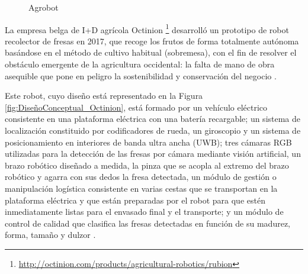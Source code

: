 \begin{figure}[H]
    \begin{center}
      \subcapcentertrue
      \hspace{2mm}
    \end{center}
    \caption{Agrobot}
    \label{fig:Agrobot}
  \end{figure}

\pagebreak
La empresa belga de I+D agrícola Octinion \footnote{\url{http://octinion.com/products/agricultural-robotics/rubion}} desarrolló un prototipo de robot recolector de fresas en 2017, que recoge los frutos de forma totalmente autónoma basándose en el método de cultivo habitual (sobremesa), con el fin de resolver el obstáculo emergente de la agricultura occidental: la falta de mano de obra asequible que pone en peligro la sostenibilidad y conservación del negocio \cite{DePreter18}.

Este robot, cuyo diseño está representado en la Figura \ref{fig:DiseñoConceptual_Octinion}, está formado por un vehículo eléctrico consistente en una plataforma eléctrica con una batería recargable; un sistema de localización constituido por codificadores de rueda, un giroscopio y un sistema de posicionamiento en interiores de banda ultra ancha (UWB); tres cámaras RGB utilizadas para la detección de las fresas por cámara mediante visión artificial, un brazo robótico diseñado a medida, la pinza que se acopla al extremo del brazo robótico y agarra con sus dedos la fresa detectada, un módulo de gestión o manipulación logística consistente en varias cestas que se transportan en la plataforma eléctrica y que están preparadas por el robot para que estén inmediatamente listas para el envasado final y el transporte; y un módulo de control de calidad que clasifica las fresas detectadas en función de su madurez, forma, tamaño y dulzor \cite{DePreter18}.

